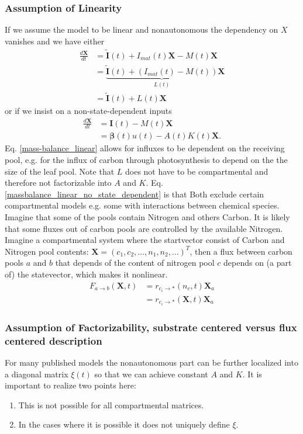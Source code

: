 \documentclass[journal abbreviation, manuscript]{copernicus}
\theoremstyle{definition}
\newcommand{\X}{\mathbf{X}}
\newcommand{\I}{\mathbf{I}}
\newcommand{\bv}{\bm{\beta}}
\begin{document}
\subsubsection{Assumption of Linearity}
If we assume the model to be linear and nonautonomous the dependency on $X$ vanishes and we have
either
\begin{align}
\frac{d \X}{d t}
  &=\tilde{\mathbf{I}}(t)+I_{mat}(t)\X - M(t) \X  \nonumber
  \\
  &=\underbrace{\tilde{\mathbf{I}}(t)+(I_{mat}(t) - M(t))}_{L(t)} \X \label{massbalance_linear} \\
  &=\tilde{\mathbf{I}}(t)+L(t) \X \nonumber
\end{align}
or if we insist on a non-state-dependent inputs 
\begin{align}
\frac{d \X}{d t}
  &=\I(t) - M(t) \X \label{massbalance_linear_no_state_dependent}
  \\
  &= \bv(t)u(t) - A(t) K(t) \X \nonumber .
\end{align} 
Eq. \eqref{mass-balance_linear} allows for influxes to be dependent on the receiving pool, e.g. for the influx of carbon through photosynthesis to depend on the the size of the leaf pool. Note that $L$ does not have to be compartmental and therefore not factorizable into $A$ and $K$.
Eq. \eqref{massbalance_linear_no_state_dependent} is that 
Both  exclude certain compartmental models e.g. some with interactions between chemical species. 
Imagine that some of the pools contain Nitrogen and others Carbon.
It is likely that some fluxes out of carbon pools are controlled by the
available Nitrogen.  
Imagine a compartmental system where the startvector
consist of Carbon and Nitrogen pool contents: $\X=(c_1,c_2,\dots,
n_1,n_2,\dots )^T$, then a flux between carbon pools $a$ and $b$ that
depends of the content of nitrogen pool $c$ depends on (a part of) the
statevector, which makes it nonlinear.
\begin{align*}
F_{a \rightarrow b} (\X,t)  &= r_{c_i \rightarrow *}(n_c,t) \X_a \\
                            &= r_{c_i \rightarrow *}(\X,t) \X_a
\end{align*}


\subsubsection{Assumption of Factorizability, substrate centered versus flux centered description}
For many published models the nonautonomous part  can be further localized into a diagonal matrix $\xi(t)$ so that we can achieve constant $A$ and $K$. It is important to realize two points here:
\begin{enumerate}
\item \label{substrate_xi}
  This is not possible for all compartmental matrices.
\item  \label{define_xi}
  In the cases where it is possible it does not uniquely define $\xi$.
\end{enumerate}
\end{document}
